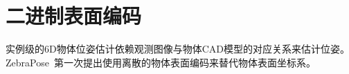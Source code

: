 \section{二进制表面编码}
实例级的6D物体位姿估计依赖观测图像与物体CAD模型的对应关系来估计位姿。ZebraPose~\cite{su2022zebrapose}第一次提出使用离散的物体表面编码来替代物体表面坐标系。